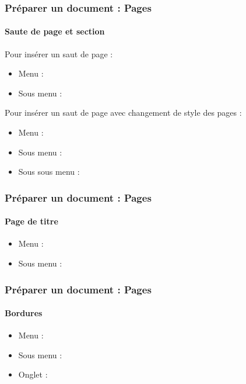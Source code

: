 \documentclass[xcolor=table]{beamer}
\begin{document}
\begin{frame}[t]
\frametitle{Préparer un document : Pages}
\framesubtitle{Saute de page et section}

\begin{minipage}{0.44\textwidth}
	Pour insérer un saut de page : 
	\begin{itemize}
		\item Menu :  
		\item Sous menu : 
	\end{itemize}

	Pour insérer un saut de page avec changement de style des pages : 
	\begin{itemize}
		\item Menu :  
		\item Sous menu : 
		\item Sous sous menu : 
	\end{itemize}
\end{minipage}
\begin{minipage}{0.55\textwidth}

	\vspace{6pt}
\end{minipage}

\end{frame}

\begin{frame}[t]
\frametitle{Préparer un document : Pages}
\framesubtitle{Page de titre}

\begin{minipage}{0.54\textwidth}
	\begin{itemize}
		\item Menu :  
		\item Sous menu : 
	\end{itemize}
\end{minipage}
\begin{minipage}{0.45\textwidth}
\end{minipage}

\end{frame}

\begin{frame}[t]
\frametitle{Préparer un document : Pages}
\framesubtitle{Bordures}

\begin{minipage}{0.43\textwidth}
	\begin{itemize}
		\item Menu :  
		\item Sous menu : 
		\item Onglet : 
	\end{itemize}
\end{minipage}
\begin{minipage}{0.55\textwidth}
\end{minipage}

\end{frame}
\end{document}
